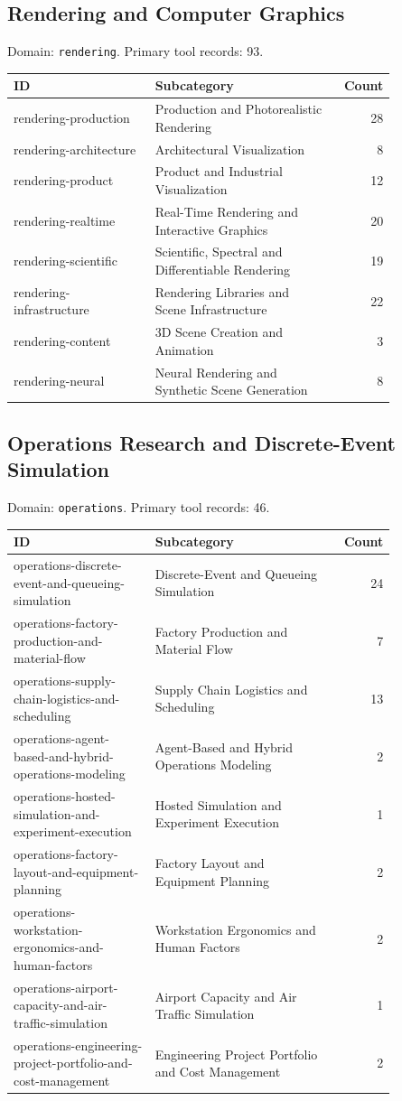 \subsection{Rendering and Computer Graphics}
\noindent Domain: \texttt{rendering}. Primary tool records: 93.
\begin{longtable}{p{0.37\linewidth}p{0.47\linewidth}r}
ID & Subcategory & Count\\\hline\endhead
rendering-production & Production and Photorealistic Rendering & 28\\
rendering-architecture & Architectural Visualization & 8\\
rendering-product & Product and Industrial Visualization & 12\\
rendering-realtime & Real-Time Rendering and Interactive Graphics & 20\\
rendering-scientific & Scientific, Spectral and Differentiable Rendering & 19\\
rendering-infrastructure & Rendering Libraries and Scene Infrastructure & 22\\
rendering-content & 3D Scene Creation and Animation & 3\\
rendering-neural & Neural Rendering and Synthetic Scene Generation & 8\\
\end{longtable}
\subsection{Operations Research and Discrete-Event Simulation}
\noindent Domain: \texttt{operations}. Primary tool records: 46.
\begin{longtable}{p{0.37\linewidth}p{0.47\linewidth}r}
ID & Subcategory & Count\\\hline\endhead
operations-discrete-event-and-queueing-simulation & Discrete-Event and Queueing Simulation & 24\\
operations-factory-production-and-material-flow & Factory Production and Material Flow & 7\\
operations-supply-chain-logistics-and-scheduling & Supply Chain Logistics and Scheduling & 13\\
operations-agent-based-and-hybrid-operations-modeling & Agent-Based and Hybrid Operations Modeling & 2\\
operations-hosted-simulation-and-experiment-execution & Hosted Simulation and Experiment Execution & 1\\
operations-factory-layout-and-equipment-planning & Factory Layout and Equipment Planning & 2\\
operations-workstation-ergonomics-and-human-factors & Workstation Ergonomics and Human Factors & 2\\
operations-airport-capacity-and-air-traffic-simulation & Airport Capacity and Air Traffic Simulation & 1\\
operations-engineering-project-portfolio-and-cost-management & Engineering Project Portfolio and Cost Management & 2\\
\end{longtable}
